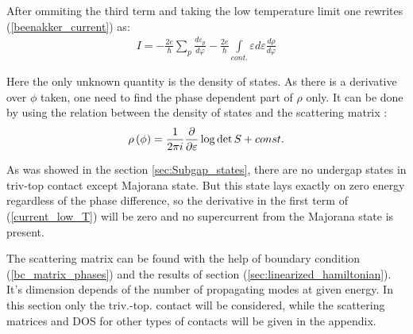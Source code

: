 After ommiting the third term and taking the low temperature limit one rewrites (\ref{beenakker_current}) as:
\begin{gather}
\label{current_low_T}
		I =
		-
	\frac{2e}{\hbar}
	\sum_p
	\frac{d \varepsilon_p}{d\varphi}
	-
	\frac{2e}{\hbar}
	\int\limits_{cont.}\varepsilon d\varepsilon 
	\frac{d\rho}{d\varphi}
\end{gather}

Here the only unknown quantity  is the density of states. As there is a derivative over $ \phi $ taken, one need to find the phase dependent part of $\rho  $ only. It can be done by using the relation between the density of states and the scattering matrix \cite{Akkermans_Avron_Shapiro_scattering_matrix}:
\begin{gather}
\label{smatrix_and_DOS}
	\rho\left(\phi\right)=\frac{1}{2\pi i}\frac{\partial}{\partial \varepsilon}\log \det S +const.
\end{gather}

As was showed in the section \ref{sec:Subgap_states}, there are no undergap states in triv-top contact except Majorana state. But this state lays exactly on zero energy regardless of the phase difference, so the derivative in the first term of (\ref{current_low_T}) will be zero and no supercurrent from the Majorana state is present.

The scattering matrix can be found with the help of boundary condition (\ref{bc_matrix_phases}) and the results of section (\ref{sec:linearized_hamiltonian}). It's dimension depends of the number of propagating modes at given energy. In this section only the triv.-top. contact will be considered, while the scattering matrices and DOS for other types of contacts will be given in the appendix.


